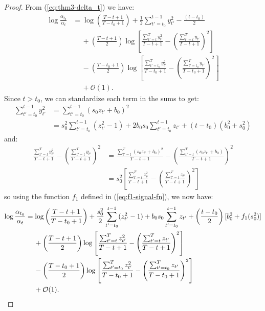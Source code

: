 \begin{proof}
From (\ref{eq:thm3-delta_t}) we have:
\begin{align*}
    \log \frac{\alpha_{t_0}}{\alpha_t} &= \log \left(\frac{T - t + 1}{T - t_0 +1} \right) + \frac{1}{2} \sum_{t' = t_0}^{t - 1} y_{t'}^2 - \frac{(t-t_0)}{2} \\
    &\quad\: + \left(\frac{T - t +1}{2}\right)\log\left[\frac{\sum_{t'=t}^T y_{t'}^2}{T-t+1} - \left(\frac{\sum_{t'=t}^T y_{t'}}{T-t+1}\right)^2 \right] \\
    &\quad\: -\left(\frac{T - t_0 +1}{2}\right)\log\left[\frac{\sum_{t'=t_0}^T y_{t'}^2}{T-t_0+1} - \left(\frac{\sum_{t'=t_0}^T y_{t'}}{T-t_0+1}\right)^2 \right] \\
    &\quad\: + \mathcal{O}(1).
\end{align*}
Since $t > t_0$, we can standardize each term in the sums to get:
\begin{align*}
    \sum_{t' = t_0}^{t - 1} y_{t'}^2 &= \sum_{t' = t_0}^{t - 1} (s_0z_{t'} + b_0)^2 \\
    &= s_0^2 \sum_{t' = t_0}^{t - 1} (z_{t'}^2 -1) + 2 b_0 s_0 \sum_{t' = t_0}^{t - 1} z_{t'} + (t-t_0)(b_0^2 +s_0^2)
\end{align*}
and:
\begin{align*}
    \frac{\sum_{t'=t}^T y_{t'}^2}{T-t+1} - \left(\frac{\sum_{t'=t}^T y_{t'}}{T-t+1}\right)^2 &= \frac{\sum_{t'=t}^T (s_0z_{t'} + b_0)^2}{T-t+1} - \left(\frac{\sum_{t'=t}^T (s_0z_{t'} + b_0)}{T-t+1}\right)^2 \\
    &= s_0^2 \left[\frac{\sum_{t'=t}^T z_{t'}^2}{T-t+1} - \left(\frac{\sum_{t'=t}^T z_{t'}}{T-t+1}\right)^2\right]
\end{align*}
so using the function $f_1$ defined in (\ref{eq:f1-signal-fn}), we now have:
\begin{align}
    \log \frac{\alpha_{t_0}}{\alpha_t} &= \log \left(\frac{T - t + 1}{T - t_0 +1} \right) + \frac{s_0^2}{2} \sum_{t' = t_0}^{t - 1} (z_{t'}^2-1) + b_0 s_0 \sum_{t' = t_0}^{t - 1} z_{t'} + \left(\frac{t-t_0}{2}\right)[b_0^2+ f_1(s_0^2)] \notag \\
    &\quad\: + \left(\frac{T - t +1}{2}\right)\log\left[\frac{\sum_{t'=t}^T z_{t'}^2}{T-t+1} - \left(\frac{\sum_{t'=t}^T z_{t'}}{T-t+1}\right)^2\right] \notag \\
    &\quad\: -\left(\frac{T - t_0 +1}{2}\right)\log\left[\frac{\sum_{t'=t_0}^T z_{t'}^2}{T-t_0+1} - \left(\frac{\sum_{t'=t_0}^T z_{t'}}{T-t_0+1}\right)^2\right] \notag \\
    &\quad\: + \mathcal{O}(1). \label{eq:thm3-cs1-bd0}
\end{align}

\end{proof}
